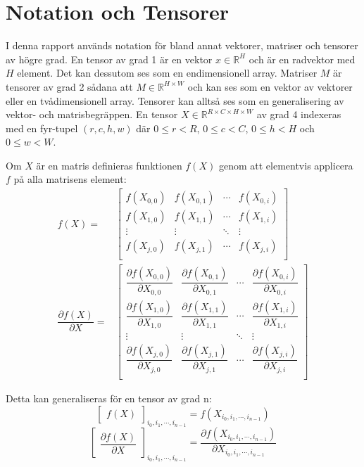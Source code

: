 \documentclass[a4paper,11pt,twoside]{article}
\newcommand*{\pd}[2]{\ensuremath{\dfrac{\partial #1}{\partial #2}}}
\begin{document}
\section{Notation och Tensorer}
I denna rapport används notation för bland annat vektorer, matriser och tensorer av högre grad. En tensor av grad 1 är en vektor $x \in \mathbb{R}^H$ och är en radvektor med $H$ element. Det kan dessutom ses som en endimensionell array. Matriser $M$ är tensorer av grad 2 sådana att $M \in \mathbb{R}^{H \times W}$ och kan ses som en vektor av vektorer eller en tvådimensionell array. Tensorer kan alltså ses som en generalisering av vektor- och matrisbegräppen. En tensor $X \in \mathbb{R}^{R \times C \times H \times W}$ av grad 4 indexeras med en fyr-tupel $(r,c,h,w)$ där $0 \leq r < R$, $0 \leq c < C$, $0 \leq h < H$ och $0 \leq w < W$. 


Om $X$ är en matris definieras funktionen $f(X)$ genom att elementvis applicera $f$ på alla matrisens element:
\begin{align}
	f(X) = 
	& \begin{bmatrix}
	f(X_{0,0}) & f(X_{0,1}) & \cdots & f(X_{0,i}) \\
	f(X_{1,0}) & f(X_{1,1}) & \cdots & f(X_{1,i}) \\
	\vdots     & \vdots     & \ddots & \vdots     \\
	f(X_{j,0}) & f(X_{j,1}) & \cdots & f(X_{j,i}) \\
	\end{bmatrix} \\
\pd{f(X)}{X} = 
	& \begin{bmatrix}
	\pd{f(X_{0,0})}{X_{0,0}} & \pd{f(X_{0,1})}{X_{0,1}} & \cdots & \pd{f(X_{0,i})}{X_{0,i}} \\
	\pd{f(X_{1,0})}{X_{1,0}} & \pd{f(X_{1,1})}{X_{1,1}} & \cdots & \pd{f(X_{1,i})}{X_{1,i}} \\
	\vdots                   & \vdots                   & \ddots & \vdots     \\
	\pd{f(X_{j,0})}{X_{j,0}} & \pd{f(X_{j,1})}{X_{j,1}} & \cdots & \pd{f(X_{j,i})}{X_{j,i}} \\
	\end{bmatrix}
\end{align}

Detta kan generaliseras för en tensor av grad n:
\begin{equation}\label{f(x)}
	\begin{bmatrix} f(X) \end{bmatrix}_{i_0, i_1, \cdots, i_{n-1}}
	= f(X_{i_0, i_1, \cdots, i_{n-1}})
\end{equation}
\begin{equation}\label{f'(x)}
	\begin{bmatrix}
	\pd{f(X)}{X}
	\end{bmatrix}_{i_0, i_1, \cdots, i_{n-1}}
	=
	\pd{f(X_{i_0, i_1, \cdots, i_{n-1}})}{X_{i_0, i_1, \cdots, i_{n-1}}}
\end{equation}
\end{document}
